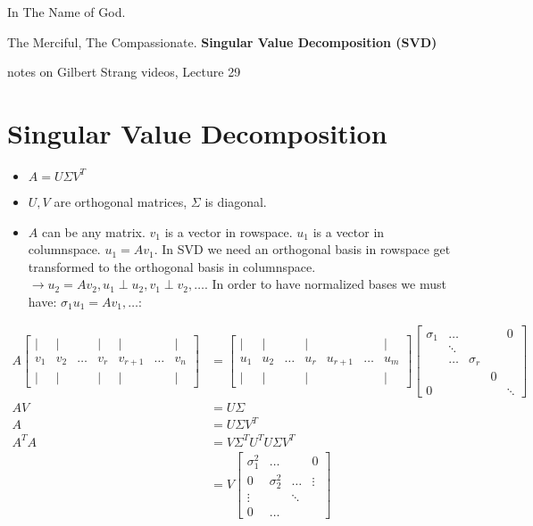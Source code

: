 \documentclass[a4paper,12pt]{article}
\theoremstyle{definition} \newtheorem{Theorem}{Theorem}
\begin{document}
\begin{center}
In The Name of God.

The Merciful, The Compassionate.
\vskip 1cm
{\Large\bfseries{Singular Value Decomposition (SVD) }}

\vskip 0.2cm
\tiny{notes on Gilbert Strang videos, Lecture 29}
\end{center}

\section{Singular Value Decomposition}
\begin{itemize}
\item $A = U \Sigma V^T$
\item $U, V$ are orthogonal matrices, $\Sigma$ is diagonal.
\item $A$ can be any matrix.
$v_1$ is a vector in rowspace. $u_1$ is a vector in columnspace. $u_1 = A v_1$. In SVD we need an orthogonal
basis in rowspace get transformed to the orthogonal basis in columnspace. $\rightarrow u_2 = A v_2, u_1 \perp u_2, 
v_1 \perp v_2, \ldots$. In order to have normalized bases we must have: $\sigma_1 u_1 = A v_1, \ldots $:
\end{itemize}
\begin{align*}
A \begin{bmatrix}
			\mid & \mid &        & \mid &   \mid   &	      & \mid \\
			v_1  &  v_2 & \ldots & v_r  & v_{r+1} & \ldots & v_n  \\
			\mid & \mid &        & \mid &   \mid   &		& \mid
		  \end{bmatrix} 
		  &= 
		  \begin{bmatrix}
			\mid & \mid &        & \mid &   	  &		& \mid \\
			u_1  &  u_2 & \ldots & u_r  & u_{r+1} & \ldots  & u_m	 \\
			\mid & \mid &        & \mid &   	  &		& \mid 
		  \end{bmatrix}
		  \begin{bmatrix}
			\sigma_1 & \ldots &  		&   & 0 \\
				   & \ddots &  		&   &   \\
			 	   & \ldots & \sigma_r  	&   &   \\
			 	   & 		&  		& 0 &   \\
			0	   & 		&  		&   & \ddots   
		  \end{bmatrix} \\
			A V   &= U \Sigma  \\
			A     &= U \Sigma V^T \\
			A^T A &= V \Sigma^T U^T U \Sigma V^T \\
				&= V  \begin{bmatrix}
					\sigma_1^2  & \ldots 	 & 		& 0 	   \\
					0		& \sigma_2^2 & \ldots   & \vdots \\
					\vdots	& 		 & \ddots  	&        \\
					0		& \ldots	 & 		&
					\end{bmatrix}
		\end{align*}
\end{document}
